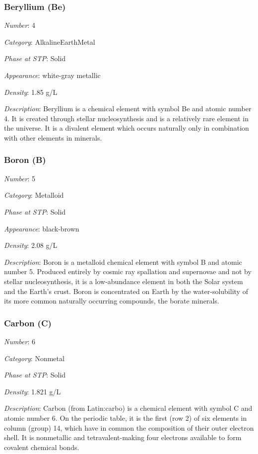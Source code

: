 \documentclass{article}
\begin{document}
\hypertarget{subsubsection::Be}{}\subsubsection{Beryllium (Be)}

\textit{Number}: 4

\textit{Category}: AlkalineEarthMetal

\textit{Phase at STP}: Solid

\textit{Appearance}: white-gray metallic

\textit{Density}: 1.85 g/L

\textit{Description}: Beryllium is a chemical element with symbol Be and atomic number 4. It is created through stellar nucleosynthesis and is a relatively rare element in the universe. It is a divalent element which occurs naturally only in combination with other elements in minerals.

\hypertarget{subsubsection::B}{}\subsubsection{Boron (B)}

\textit{Number}: 5

\textit{Category}: Metalloid

\textit{Phase at STP}: Solid

\textit{Appearance}: black-brown

\textit{Density}: 2.08 g/L

\textit{Description}: Boron is a metalloid chemical element with symbol B and atomic number 5. Produced entirely by cosmic ray spallation and supernovae and not by stellar nucleosynthesis, it is a low-abundance element in both the Solar system and the Earth's crust. Boron is concentrated on Earth by the water-solubility of its more common naturally occurring compounds, the borate minerals.

\hypertarget{subsubsection::C}{}\subsubsection{Carbon (C)}

\textit{Number}: 6

\textit{Category}: Nonmetal

\textit{Phase at STP}: Solid

\textit{Density}: 1.821 g/L

\textit{Description}: Carbon (from Latin:carbo) is a chemical element with symbol C and atomic number 6. On the periodic table, it is the first (row 2) of six elements in column (group) 14, which have in common the composition of their outer electron shell. It is nonmetallic and tetravalent-making four electrons available to form covalent chemical bonds.
\end{document}
